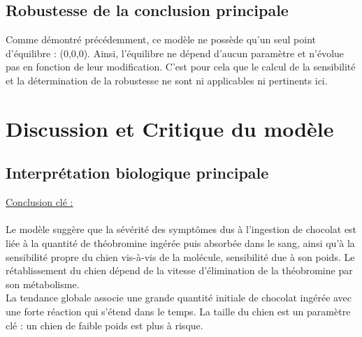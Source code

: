 \documentclass[11pt,a4paper]{article}
\begin{document}

\subsection{Robustesse de la conclusion principale}

Comme démontré précédemment, ce modèle ne possède qu'un seul point d'équilibre : (0,0,0).
Ainsi, l'équilibre ne dépend d'aucun paramètre et n'évolue pas en fonction de leur modification. 
C'est pour cela que le calcul de la sensibilité et la détermination de la robustesse ne sont ni
applicables ni pertinents ici.



\section{Discussion et Critique du modèle}
\label{sec:discussion}

\subsection{Interprétation biologique principale}

\underline{Conclusion clé :} 
\\
\\
Le modèle suggère que la sévérité des symptômes dus à l'ingestion de chocolat est liée à la 
quantité de théobromine ingérée puis absorbée dans le sang, ainsi qu'à la sensibilité propre 
du chien vis-à-vis de la molécule, sensibilité due à son poids. Le rétablissement du chien dépend de la vitesse 
d'élimination de la théobromine par son métabolisme. \\
La tendance globale associe une grande 
quantité initiale de chocolat ingérée avec une forte réaction qui s'étend dans le temps. 
La taille du chien est un paramètre clé : un chien de faible poids est plus à risque.
\\
\end{document}
